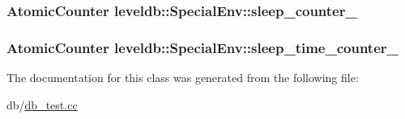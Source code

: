 \hypertarget{classleveldb_1_1_special_env_abb5c524c3a6f106ec564c09301fc7b63}{
\subsubsection[{sleep\-\_\-counter\-\_\-}]{\setlength{\rightskip}{0pt plus 5cm}Atomic\-Counter leveldb\-::\-Special\-Env\-::sleep\-\_\-counter\-\_\-}}\label{classleveldb_1_1_special_env_abb5c524c3a6f106ec564c09301fc7b63}
\hypertarget{classleveldb_1_1_special_env_a023eb2fe05fb56d3fb487d12ea14f904}{
\subsubsection[{sleep\-\_\-time\-\_\-counter\-\_\-}]{\setlength{\rightskip}{0pt plus 5cm}Atomic\-Counter leveldb\-::\-Special\-Env\-::sleep\-\_\-time\-\_\-counter\-\_\-}}\label{classleveldb_1_1_special_env_a023eb2fe05fb56d3fb487d12ea14f904}


The documentation for this class was generated from the following file\-:\begin{DoxyCompactItemize}
\item 
db/\hyperlink{db__test_8cc}{db\-\_\-test.\-cc}\end{DoxyCompactItemize}
